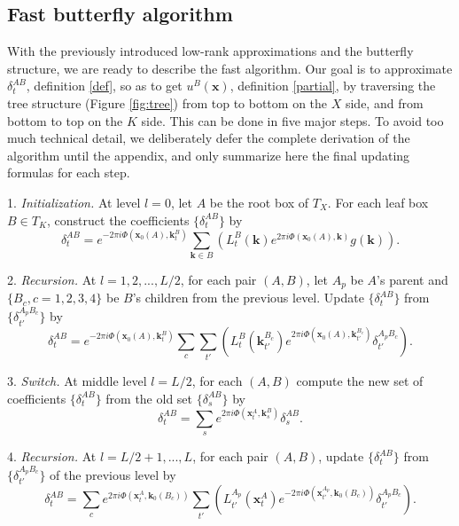 
\subsection{Fast butterfly algorithm}

With the previously introduced low-rank approximations and the butterfly structure, we are ready to describe the fast algorithm. Our goal is to approximate $\delta_t^{AB}$, definition \ref{def}, so as to get $u^B(\mathbf{x})$, definition \ref{partial}, by traversing the tree structure (Figure \ref{fig:tree}) from top to bottom on the $X$ side, and from bottom to top on the $K$ side. This can be done in five major steps. To avoid too much technical detail, we deliberately defer the complete derivation of the algorithm until the appendix, and only summarize here the final updating formulas for each step.

1. {\it Initialization.} At level $l=0$, let $A$ be the root box of $T_X$. For each leaf box $B\in T_K$, construct the coefficients $\{\delta_t^{AB}\}$ by
\begin{equation} \label{Delta1}
\delta_t^{AB}=e^{-2\pi i
  \Phi(\mathbf{x}_0(A),\mathbf{k}_t^B)}\sum_{\mathbf{k}\in B}\left(
  L_t^B(\mathbf{k}) e^{2\pi i \Phi(\mathbf{x}_0(A),\mathbf{k})}g(\mathbf{k}) \right).
\end{equation}

2. {\it Recursion.} At $l=1,2,...,L/2$, for each pair $(A,B)$, let $A_p$ be $A$'s parent and $\{B_c, c=1,2,3,4\}$ be $B$'s children from the previous level. Update $\{\delta_t^{AB}\}$ from $\{\delta_{t'}^{A_pB_c}\}$ by
\begin{equation} \label{Delta2}
\delta_t^{AB}=e^{-2\pi i
  \Phi(\mathbf{x}_0(A),\mathbf{k}_t^B)}\sum_c\sum_{t'}
\left(L_t^B(\mathbf{k}_{t'}^{B_c})e^{2\pi i
  \Phi(\mathbf{x}_0(A),\mathbf{k}_{t'}^{B_c})}\delta_{t'}^{A_pB_c}\right).
\end{equation}

3. {\it Switch.} At middle level $l=L/2$, for each $(A,B)$ compute the new set of coefficients $\{\delta_t^{AB}\}$ from the old set $\{\delta_s^{AB}\}$ by
\begin{equation} \label{Delta3}
\delta^{AB}_t=
\sum_s e^{2\pi i \Phi(\mathbf{x}_t^A,\mathbf{k}_s^B)}\delta_s^{AB}.
\end{equation}
 
4. {\it Recursion.} At $l=L/2+1,...,L$, for each pair $(A,B)$, update $\{\delta_t^{AB}\}$ from $\{\delta_{t'}^{A_pB_c}\}$ of the previous level by
\begin{equation} \label{Delta4}
\delta_t^{AB}=\sum_c  e^{2\pi i \Phi(\mathbf{x}_t^A,\mathbf{k}_0(B_c))}\sum_{t'} \left( L_{t'}^{A_p}(\mathbf{x}_t^A) e^{-2\pi i \Phi(\mathbf{x}_{t'}^{A_p},\mathbf{k}_0(B_c))}\delta_{t'}^{A_pB_c}\right).
\end{equation}

